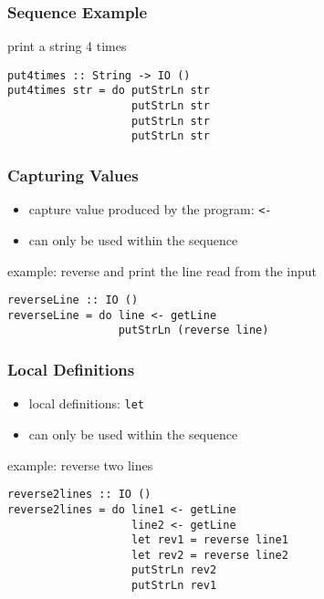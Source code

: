 \documentclass[dvipsnames]{beamer}
\theoremstyle{plain}
\begin{document}
\begin{frame}[fragile]
  \frametitle{Sequence Example}

  \begin{exampleblock}{print a string 4 times}
    \begin{lstlisting}
put4times :: String -> IO ()
put4times str = do putStrLn str
                   putStrLn str
                   putStrLn str
                   putStrLn str
    \end{lstlisting}
  \end{exampleblock}
\end{frame}

\begin{frame}[fragile]
  \frametitle{Capturing Values}

  \begin{itemize}
    \item capture value produced by the program: \lstinline|<-|
    \item can only be used within the sequence
  \end{itemize}

  \begin{exampleblock}{example: reverse and print the line read from the input}
    \begin{lstlisting}
reverseLine :: IO ()
reverseLine = do line <- getLine
                 putStrLn (reverse line)
    \end{lstlisting}
  \end{exampleblock}
\end{frame}

\begin{frame}[fragile]
  \frametitle{Local Definitions}

  \begin{itemize}
    \item local definitions: \lstinline|let|
    \item can only be used within the sequence
  \end{itemize}

  \begin{exampleblock}{example: reverse two lines}
    \begin{lstlisting}
reverse2lines :: IO ()
reverse2lines = do line1 <- getLine
                   line2 <- getLine
                   let rev1 = reverse line1
                   let rev2 = reverse line2
                   putStrLn rev2
                   putStrLn rev1
    \end{lstlisting}
  \end{exampleblock}
\end{frame}
\end{document}
